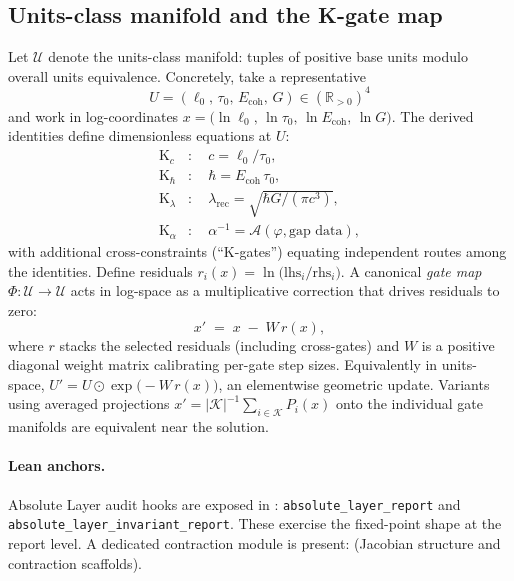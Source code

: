 \documentclass[11pt]{article}
\begin{document}
\subsection{Units\mbox{-}class manifold and the K\mbox{-}gate map}
Let \(\mathcal{U}\) denote the units\mbox{-}class manifold: tuples of positive base units modulo overall units equivalence. Concretely, take a representative
\[
  U=(\ell_0,\, \tau_0,\, E_{\mathrm{coh}},\, G)\in (\mathbb{R}_{>0})^4
\]
and work in log\mbox{-}coordinates \(x=\bigl(\ln \ell_0,\, \ln \tau_0,\, \ln E_{\mathrm{coh}},\, \ln G\bigr)\). The derived identities define dimensionless equations at \(U\):
\begin{align*}
  \mathrm{K}_c&:\quad c=\ell_0/\tau_0,\\
  \mathrm{K}_{\hbar}&:\quad \hbar=E_{\mathrm{coh}}\,\tau_0,\\
  \mathrm{K}_{\lambda}&:\quad \lambda_{\mathrm{rec}}=\sqrt{\hbar G/(\pi c^3)},\\
  \mathrm{K}_{\alpha}&:\quad \alpha^{-1}=\mathcal{A}(\varphi,\text{gap data}),
\end{align*}
with additional cross\mbox{-}constraints (``K\mbox{-}gates'') equating independent routes among the identities. Define residuals \(r_i(x)=\ln\bigl(\mathrm{lhs}_i/\mathrm{rhs}_i\bigr)\). A canonical \emph{gate map} \(\Phi\colon \mathcal{U}\to\mathcal{U}\) acts in log\mbox{-}space as a multiplicative correction that drives residuals to zero:
\[
  x'\;=\;x\; -\; W\, r(x),
\]
where \(r\) stacks the selected residuals (including cross\mbox{-}gates) and \(W\) is a positive diagonal weight matrix calibrating per\mbox{-}gate step sizes. Equivalently in units\mbox{-}space, \(U' = U\odot \exp\bigl(-W\, r(x)\bigr)\), an elementwise geometric update. Variants using averaged projections \(x' = |\mathcal{K}|^{-1}\sum_{i\in\mathcal{K}} P_i(x)\) onto the individual gate manifolds are equivalent near the solution.

\paragraph{Lean anchors.} Absolute Layer audit hooks are exposed in : \texttt{absolute\_layer\_report} and \texttt{absolute\_layer\_invariant\_report}. These exercise the fixed\mbox{-}point shape at the report level. A dedicated contraction module is present:  (Jacobian structure and contraction scaffolds).
\end{document}
